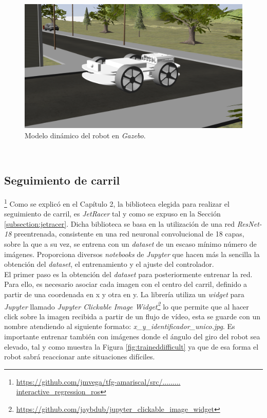 \begin{figure} [h!]
	\begin{center}
		\includegraphics[width=12cm]{figs/modelGazebo}
	\end{center}
	\caption{Modelo dinámico del robot en \textit{Gazebo}.}
	\label{fig:modelGazebo}
\end{figure}\

\subsection{Seguimiento de carril}
\label{subsection:lanefollower}
\footnote{\url{https://github.com/jmvega/tfg-amariscal/src/......... interactive_regression_ros}}
Como se explicó en el Capítulo 2, la biblioteca elegida para realizar el seguimiento de carril, es \textit{JetRacer} tal y como se expuso en la Sección \ref{subsection:jetracer}. Dicha biblioteca se basa en la utilización de una red \textit{ResNet-18} preentrenada, consistente en una red neuronal convolucional de 18 capas, sobre la que a su vez, se entrena con un \textit{dataset} de un escaso mínimo número de imágenes. Proporciona diversos \textit{notebooks} de \textit{Jupyter} que hacen más la sencilla la obtención del \textit{dataset}, el entrenamiento y el ajuste del controlador.\\

El primer paso es la obtención del \textit{dataset} para posteriormente entrenar la red. Para ello, es necesario asociar cada imagen con el centro del carril, definido a partir de una coordenada en x y otra en y. La librería utiliza un \textit{widget} para \textit{Jupyter} llamado \textit{Jupyter Clickable Image Widget\footnote{\url{https://github.com/jaybdub/jupyter_clickable_image_widget}}} lo que permite que al hacer click sobre la imagen recibida a partir de un flujo de vídeo, esta se guarde con un nombre atendiendo al siguiente formato: \textit{x\_y\_identificador\_unico.jpg}. Es importante entrenar también con imágenes donde el ángulo del giro del robot sea elevado, tal y como muestra la Figura \ref{fig:traineddifficult} ya que de esa forma el robot sabrá reaccionar ante situaciones difíciles.\\

